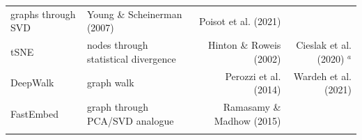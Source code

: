 \documentclass[10pt,oneside]{article}
\begin{document}
\begin{longtable}[]{@{}llrr@{}}
\begin{minipage}[t]{0.32\columnwidth}
graphs through SVD\strut
\end{minipage} & \begin{minipage}[t]{0.18\columnwidth}\raggedleft
Young \& Scheinerman (2007)\strut
\end{minipage} & \begin{minipage}[t]{0.28\columnwidth}\raggedleft
Poisot et al. (2021)\strut
\end{minipage}\tabularnewline
\begin{minipage}[t]{0.11\columnwidth}\raggedright
tSNE\strut
\end{minipage} & \begin{minipage}[t]{0.32\columnwidth}\raggedright
nodes through statistical divergence\strut
\end{minipage} & \begin{minipage}[t]{0.18\columnwidth}\raggedleft
Hinton \& Roweis (2002)\strut
\end{minipage} & \begin{minipage}[t]{0.28\columnwidth}\raggedleft
Cieslak et al. (2020) \(^a\)\strut
\end{minipage}\tabularnewline
\begin{minipage}[t]{0.11\columnwidth}\raggedright
DeepWalk\strut
\end{minipage} & \begin{minipage}[t]{0.32\columnwidth}\raggedright
graph walk\strut
\end{minipage} & \begin{minipage}[t]{0.18\columnwidth}\raggedleft
Perozzi et al. (2014)\strut
\end{minipage} & \begin{minipage}[t]{0.28\columnwidth}\raggedleft
Wardeh et al. (2021)\strut
\end{minipage}\tabularnewline
\begin{minipage}[t]{0.11\columnwidth}\raggedright
FastEmbed\strut
\end{minipage} & \begin{minipage}[t]{0.32\columnwidth}\raggedright
graph through PCA/SVD analogue\strut
\end{minipage} & \begin{minipage}[t]{0.18\columnwidth}\raggedleft
Ramasamy \& Madhow (2015)\strut
\end{minipage} & \begin{minipage}[t]{0.28\columnwidth}\raggedleft
\strut
\end{minipage}\tabularnewline
\begin{minipage}[t]{0.11\columnwidth}\raggedright

\end{minipage}
\end{longtable}
\end{document}

